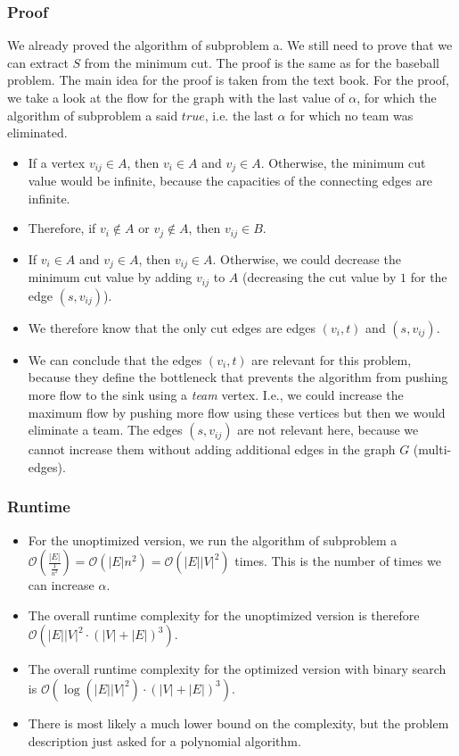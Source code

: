 \documentclass[12pt]{article}
\begin{document}
\subsubsection*{Proof}
We already proved the algorithm of subproblem a. We still need to prove that we can extract $S$ from the minimum cut. The proof is the same as for the baseball problem. The main idea for the proof is taken from the text book. For the proof, we take a look at the flow for the graph with the last value of $\alpha$, for which the algorithm of subproblem a said $\mathit{true}$, i.e. the last $\alpha$ for which no team was eliminated.

\begin{itemize}
	\item If a vertex $v_{ij} \in A$, then $v_i \in A$ and $v_j \in A$. Otherwise, the minimum cut value would be infinite, because the capacities of the connecting edges are infinite.
	\item Therefore, if $v_i \not \in A$ or $v_j \not \in A$, then $v_{ij} \in B$.
	\item If $v_i \in A$ and $v_j \in A$, then $v_{ij} \in A$. Otherwise, we could decrease the minimum cut value by adding $v_{ij}$ to $A$ (decreasing the cut value by $1$ for the edge $(s, v_{ij})$).
	\item We therefore know that the only cut edges are edges $(v_i, t)$ and $(s, v_{ij})$.
	\item We can conclude that the edges $(v_i, t)$ are relevant for this problem, because they define the bottleneck that prevents the algorithm from pushing more flow to the sink using a \emph{team} vertex. I.e., we could increase the maximum flow by pushing more flow using these vertices but then we would eliminate a team. The edges $(s, v_{ij})$ are not relevant here, because we cannot increase them without adding additional edges in the graph $G$ (multi-edges).
\end{itemize}

\subsubsection*{Runtime}
\begin{itemize}
	\item For the unoptimized version, we run the algorithm of subproblem a $\mathcal{O}(\frac{|E|}{\frac{1}{n^2}}) = \mathcal{O}(|E| n^2) = \mathcal{O}(|E| |V|^2)$ times. This is the number of times we can increase $\alpha$.
	\item The overall runtime complexity for the unoptimized version is therefore $\mathcal{O}(|E||V|^2 \cdot (|V| + |E|)^3)$.
	\item The overall runtime complexity for the optimized version with binary search is $\mathcal{O}(\log (|E||V|^2) \cdot (|V| + |E|)^3)$.
	\item There is most likely a much lower bound on the complexity, but the problem description just asked for a polynomial algorithm.
\end{itemize}
\end{document}
